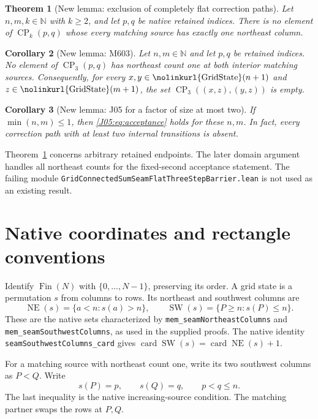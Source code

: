 \documentclass[11pt,oneside]{report}
\newtheorem{theorem}{Theorem}[section]
\newtheorem{corollary}[theorem]{Corollary}
\theoremstyle{definition}
\numberwithin{equation}{section}
\newcommand{\decl}[1]{\textnormal{\nolinkurl{#1}}}
\newcommand{\NE}{\operatorname{NE}}
\newcommand{\SW}{\operatorname{SW}}
\newcommand{\CP}{\operatorname{CP}}
\newcommand{\seamcardop}{\operatorname{card}}
\begin{document}
\begin{theorem}[New lemma: exclusion of completely flat correction paths]
\label{J05:thm:flat}
Let $n,m,k\in\mathbb N$ with $k\geq2$, and let $p,q$ be native retained indices.
There is no element of $\CP_k(p,q)$ whose every matching source has exactly one
northeast column.
\end{theorem}

\begin{corollary}[New lemma: M603]\label{J05:cor:three}
Let $n,m\in\mathbb N$ and let $p,q$ be retained indices. No element of
$\CP_3(p,q)$ has northeast count one at both interior matching sources.
Consequently, for every $x,y\in\decl{GridState}(n+1)$ and
$z\in\decl{GridState}(m+1)$, the set $\CP_3((x,z),(y,z))$ is empty.
\end{corollary}

\begin{corollary}[New lemma: J05 for a factor of size at most two]
\label{J05:cor:thin}
If $\min(n,m)\leq1$, then \eqref{J05:eq:acceptance} holds for these $n,m$.
In fact, every correction path with at least two internal transitions is absent.
\end{corollary}

Theorem~\ref{J05:thm:flat} concerns arbitrary retained endpoints.
The later domain argument handles all northeast counts for the fixed-second
acceptance statement. The failing module
\decl{GridConnectedSumSeamFlatThreeStepBarrier.lean} is not used as an
existing result.

\section{Native coordinates and rectangle conventions}

Identify $\operatorname{Fin}(N)$ with $\{0,\ldots,N-1\}$, preserving its order.
A grid state is a permutation $s$ from columns to rows. Its northeast and
southwest columns are
\[
 \NE(s)=\{a<n:s(a)>n\},\qquad
 \SW(s)=\{P\geq n:s(P)\leq n\}.
\]
These are the native sets characterized by
\decl{mem_seamNortheastColumns} and \decl{mem_seamSouthwestColumns}, as used in
the supplied proofs. The native identity \decl{seamSouthwestColumns_card} gives
$\seamcardop\SW(s)=\seamcardop\NE(s)+1$.

For a matching source with northeast count one, write its two southwest
columns as $P<Q$. Write
\[
 s(P)=p,\qquad s(Q)=q,\qquad p<q\leq n.
\]
The last inequality is the native increasing-source condition. The matching
partner swaps the rows at $P,Q$.
\end{document}
